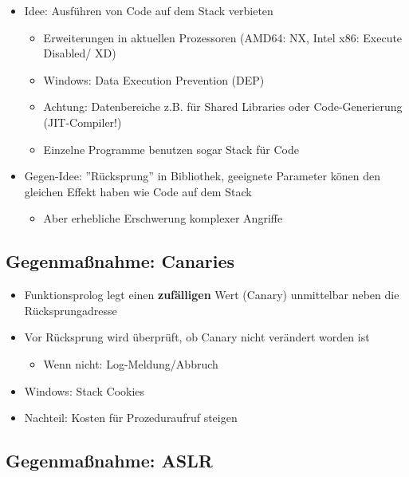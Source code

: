 \documentclass[openany]{book}
\begin{document}
\begin{itemize}
    \item Idee: Ausführen von Code auf dem Stack verbieten
    \begin{itemize}
        \item Erweiterungen in aktuellen Prozessoren (AMD64: NX, Intel x86: Execute Disabled/ XD)
        \item Windows: Data Execution Prevention (DEP)
        \item Achtung: Datenbereiche z.B. für Shared Libraries oder Code-Generierung (JIT-Compiler!)
        \item Einzelne Programme benutzen sogar Stack für Code
    \end{itemize} 
    \item Gegen-Idee: ''Rücksprung'' in Bibliothek, geeignete Parameter könen den gleichen Effekt haben wie Code auf dem Stack
    \begin{itemize}
        \item Aber erhebliche Erschwerung komplexer Angriffe
    \end{itemize}
\end{itemize}

\subsection{Gegenmaßnahme: Canaries}

\begin{itemize}
    \item Funktionsprolog legt einen \textbf{zufälligen} Wert (Canary) unmittelbar neben die Rücksprungadresse
    \item Vor Rücksprung wird überprüft, ob Canary nicht verändert worden ist
    \begin{itemize}
        \item Wenn nicht: Log-Meldung/Abbruch
    \end{itemize}
    \item Windows: Stack Cookies
    \item Nachteil: Kosten für Prozeduraufruf steigen
\end{itemize}

\subsection{Gegenmaßnahme: ASLR}
\end{document}
